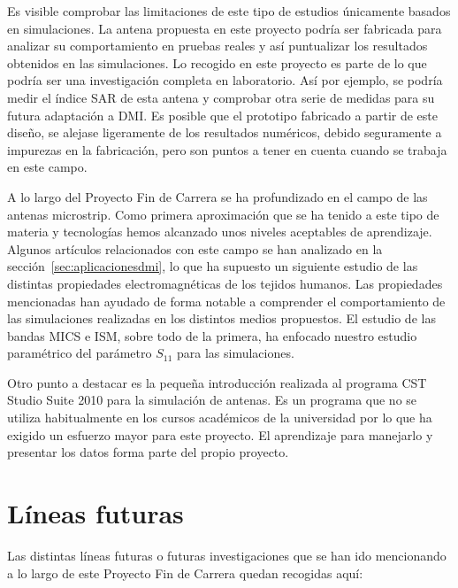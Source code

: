 Es visible comprobar las limitaciones de este tipo de estudios únicamente basados en simulaciones. La antena propuesta en este proyecto podría ser fabricada para analizar su comportamiento en pruebas reales y así puntualizar los resultados obtenidos en las simulaciones. Lo recogido en este proyecto es parte de lo que podría ser una investigación completa en laboratorio. Así por ejemplo, se podría medir el índice SAR de esta antena y comprobar otra serie de medidas para su futura adaptación a DMI. Es posible que el prototipo fabricado a partir de este diseño, se alejase ligeramente de los resultados numéricos, debido seguramente a impurezas en la fabricación, pero son puntos a tener en cuenta cuando se trabaja en este campo.

A lo largo del Proyecto Fin de Carrera se ha profundizado en el campo de las antenas microstrip. Como primera aproximación que se ha tenido a este tipo de materia y tecnologías hemos alcanzado unos niveles aceptables de aprendizaje. Algunos artículos relacionados con este campo se han analizado en la sección~\ref{sec:aplicacionesdmi}, lo que ha supuesto un siguiente estudio de las distintas propiedades electromagnéticas de los tejidos humanos. Las propiedades mencionadas han ayudado de forma notable a comprender el comportamiento de las simulaciones realizadas en los distintos medios propuestos. El estudio de las bandas MICS e ISM, sobre todo de la primera, ha enfocado nuestro estudio paramétrico del parámetro $S_{11}$ para las simulaciones.

Otro punto a destacar es la pequeña introducción realizada al programa CST Studio Suite 2010 para la simulación de antenas. Es un programa que no se utiliza habitualmente en los cursos académicos de la universidad por lo que ha exigido un esfuerzo mayor para este proyecto. El aprendizaje para manejarlo y presentar los datos forma parte del propio proyecto.


\section{Líneas futuras}

Las distintas líneas futuras o futuras investigaciones que se han ido mencionando a lo largo de este Proyecto Fin de Carrera quedan recogidas aquí:

